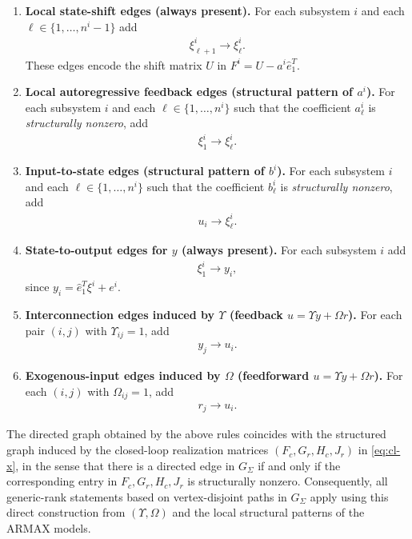 \documentclass[11pt,a4paper]{article}
\begin{document}
\begin{enumerate}
\item \textbf{Local state-shift edges (always present).}
For each subsystem $i$ and each $\ell\in\{1,\dots,n^i-1\}$ add
\begin{align*}
    \xi^i_{\ell+1} \longrightarrow \xi^i_{\ell}.
\end{align*}
These edges encode the shift matrix $U$ in $F^i=U-a^i\hat e_1^T$.
\item \textbf{Local autoregressive feedback edges (structural pattern of $a^i$).}
For each subsystem $i$ and each $\ell\in\{1,\dots,n^i\}$ such that the
coefficient $a^i_\ell$ is \emph{structurally nonzero}, add
\begin{align*}
    \xi^i_{1} \longrightarrow \xi^i_{\ell}.
\end{align*}
\item \textbf{Input-to-state edges (structural pattern of $b^i$).}
For each subsystem $i$ and each $\ell\in\{1,\dots,n^i\}$ such that the coefficient $b^i_\ell$ is \emph{structurally nonzero}, add
\begin{align*}
    u_i \longrightarrow \xi^i_{\ell}.
\end{align*}
\item \textbf{State-to-output edges for $y$ (always present).}
For each subsystem $i$ add
\begin{align*}
    \xi^i_{1} \longrightarrow y_i,
\end{align*}
since $y_i = \hat e_1^T \xi^i + e^i$.
\item \textbf{Interconnection edges induced by $\Upsilon$ (feedback $u=\Upsilon y+\Omega r$).}
For each pair $(i,j)$ with $\Upsilon_{ij}=1$, add
\begin{align*}
    y_j \longrightarrow u_i.
\end{align*}
\item \textbf{Exogenous-input edges induced by $\Omega$ (feedforward $u=\Upsilon y+\Omega r$).}
For each $(i,j)$ with $\Omega_{ij}=1$, add
\begin{align*}
    r_j \longrightarrow u_i.
\end{align*}
\end{enumerate}

The directed graph obtained by the above rules coincides with the structured graph induced by the closed-loop realization matrices $(F_c,G_r,H_c,J_r)$ in \eqref{eq:cl-x}, in the sense that there is a directed edge in $G_\Sigma$ if and only if the corresponding entry in $F_c,G_r,H_c,J_r$ is structurally nonzero. Consequently, all generic-rank statements based on vertex-disjoint paths in $G_\Sigma$ apply using this direct construction from $(\Upsilon,\Omega)$ and the local structural patterns of the ARMAX models.
\end{document}
